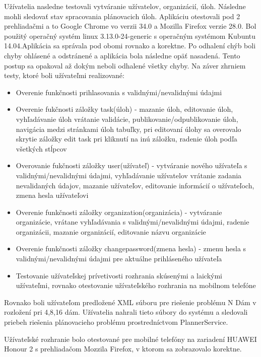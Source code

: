 Užívatelia nasledne testovali vytváranie užívatelov, organizácií, úloh. Následne mohli sledovať stav spracovania plánovacich úloh. Aplikáciu otestovali pod 2 prehliadačmi a to Google Chrome vo verzii 34.0 a Mozilla Firefox verzie 28.0. Bol použitý operačný systém linux 3.13.0-24-generic s operačným systémom Kubuntu 14.04.Aplikácia sa správala pod obomi rovnako a korektne. Po odhalení chýb boli chyby ohlásené a odstránené a aplikácia bola následne opäť nasadená. Tento postup sa opakoval až dokým neboli odhalené všetky chyby. Na záver zhrniem testy, ktoré boli užívateľmi realizované:
\begin{itemize}
\item Overenie funkčnosti prihlasovania s validnými/nevalidnými údajmi
\item Overenie fukčnosti záložky task(úloh) - mazanie úloh, editovanie úloh, vyhľadávanie úloh vrátanie validácie, publikovanie/odpublikovanie úloh, navigácia medzi stránkami úloh tabuľky, pri editovaní úlohy sa overovalo skrytie záložky edit task pri kliknutí na inú záložku, radenie úloh podľa všetkých stĺpcov
\item Overovanie fukčnosti záložky user(užívateľ) - vytváranie nového užívateľa s validnými/nevalidnými údajmi, vyhľadávanie užívatelov vrátanie zadania nevalidaných údajov, mazanie užívateľov, editovanie informácií o užívateľoch, zmena hesla užívateľovi
\item Overenie funkčnosti záložky organization(organizácia) - vytváranie organizácie, vrátane vyhľadávania s validnými/nevalidnými údajmi, radenie organizácii, mazanie organizácií, editovanie názvu organizácie
\item Overenie funkčnosti záložky changepassword(zmena hesla) - zmenu hesla s validnými/nevalidnými údajmi pre aktuálne prihláseného užívateľa
\item Testovanie užívateľskej prívetivosti rozhrania skúsenými a laickými užívateľmi, rovnako otestovanie užívateľského rozhrania na mobilnom telefóne
\end{itemize}

Rovnako boli užívateľom predložené XML súboru pre riešenie problému N Dám v rozložení pri 4,8,16 dám. Užívatelia nahrali tieto súbory do systému a sledovali priebeh riešenia plánovacieho problému prostredníctvom PlannerService.

Užívateľské rozhranie bolo otestované pre mobilné telefóny na zariadení HUAWEI Honour 2 s prehliadačom Mozzila Firefox, v ktorom sa zobrazovalo korektne.



